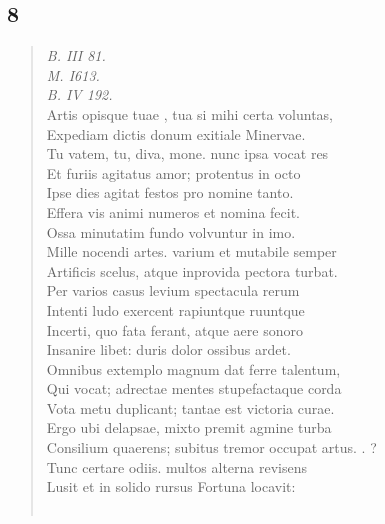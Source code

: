 \documentclass[11pt, a4paper]{report}
\begin{document}
            \subsection*{8}
      \begin{verse}
      \textit{B. III 81.} \\ \textit{M. I613.} \\ \textit{B. IV 192.} \\ Artis opisque  \lbrack tuae \rbrack , tua si mihi certa voluntas, \\ Expediam dictis donum exitiale Minervae. \\ Tu vatem, tu, diva, mone. nunc ipsa vocat res \\ Et furiis agitatus amor; protentus in octo \\ Ipse dies agitat festos pro nomine tanto. \\ Effera vis animi numeros et nomina fecit. \\ Ossa minutatim fundo volvuntur in imo. \\ Mille nocendi artes. varium et mutabile semper \\ Artificis scelus, atque inprovida pectora turbat. \\ Per varios casus levium spectacula rerum \\ Intenti ludo exercent rapiuntque ruuntque \\ Incerti, quo fata ferant, atque aere sonoro \\ Insanire libet: duris dolor ossibus ardet. \\ Omnibus extemplo magnum dat ferre talentum, \\ Qui vocat; adrectae mentes stupefactaque corda \\ Vota metu duplicant; tantae est victoria curae. \\ Ergo ubi delapsae, mixto premit agmine turba \\ Consilium quaerens; subitus tremor occupat artus. . ? \\ Tunc certare odiis. multos alterna revisens \\ Lusit et in solido rursus Fortuna locavit: \\ 
        ﻿\pagebreak 

\end{verse}
\end{document}
